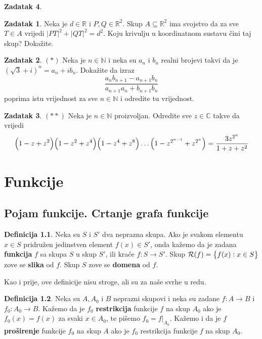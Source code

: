 \documentclass{book}
\let\originalleft\left
\let\originalright\right
\renewcommand{\left}{\mathopen{}\mathclose\bgroup\originalleft}
\renewcommand{\right}{\aftergroup\egroup\originalright}
\theoremstyle{definition}
\theoremstyle{definition}
\newtheorem{definition}{Definicija}
\newtheorem{exercise}{Zadatak}
\theoremstyle{remark}
\begin{document}
\begin{exercise}
\begin{exercise}
Neka je $d\in \mathbb{R}$ i $P, Q\in \mathbb{R}^2$. Skup $A\subseteq \mathbb{R}^2$ ima svojstvo da za sve $T\in A$ vrijedi $|PT|^2+|QT|^2=d^2$. Koju krivulju u koordinatnom sustavu čini taj skup? Dokažite.
\end{exercise}
\begin{exercise} $(*)$
Neka je $n\in \mathbb{N}$ i neka su $a_n$ i $b_n$ realni brojevi takvi da je $(\sqrt{3}+i)^n=a_n+ib_n$. Dokažite da izraz
$$\dfrac{a_nb_{n+1}-a_{n+1}b_n}{a_{n+1}a_n+b_{n+1}b_n}$$
poprima istu vrijednost za sve $n\in \mathbb{N}$ i odredite tu vrijednost.
\end{exercise}
\begin{exercise} $(**)$
Neka je $n\in \mathbb{N}$ proizvoljan. Odredite sve $z\in \mathbb{C}$ takve da vrijedi
$$\left(1-z+z^2\right)\left(1-z^2+z^4\right)\left(1-z^4+z^8\right)\dots\left(1-z^{2^{n-1}}+z^{2^n}\right)=\dfrac{3z^{2^n}}{1+z+z^2}$$
\end{exercise}
\end{exercise}
\chapter{Funkcije}
\fancyhead[RO, RE]{}
\section{Pojam funkcije. Crtanje grafa funkcije}

\begin{definition}
Neka su $S$ i $S'$ dva neprazna skupa. Ako je svakom elementu $x\in S$ pridružen jedinstven element $f(x)\in S'$, onda kažemo da je zadana \textbf{funkcija} $f$ sa skupa $S$ u skup $S'$, ili kraće $f : S\to S'$. Skup $\mathcal{R}(f)=\left\{ f(x) : x\in S\right\}$ zove se \textbf{slika} od $f$. Skup $S$ zove se \textbf{domena} od $f$.
\end{definition}

Kao i prije, ove definicije nisu stroge, ali su za naše svrhe u redu.

\begin{definition}
Neka su $A, A_0$ i $B$ neprazni skupovi i neka su zadane $f : A\to B$ i $f_0 : A_0\to B$. Kažemo da je $f_0$ \textbf{restrikcija} funkcije $f$ na skup $A_0$ ako je $f_0(x)=f(x)$ za svaki $x\in A_0$, te pišemo $f_0=f|_{A_0}$. Kažemo i da je $f$ \textbf{proširenje} funkcije $f_0$ na skup $A$ ako je $f_0$ restrikcija funkcije $f$ na skup $A_0$. 
\end{definition}
\end{document}
